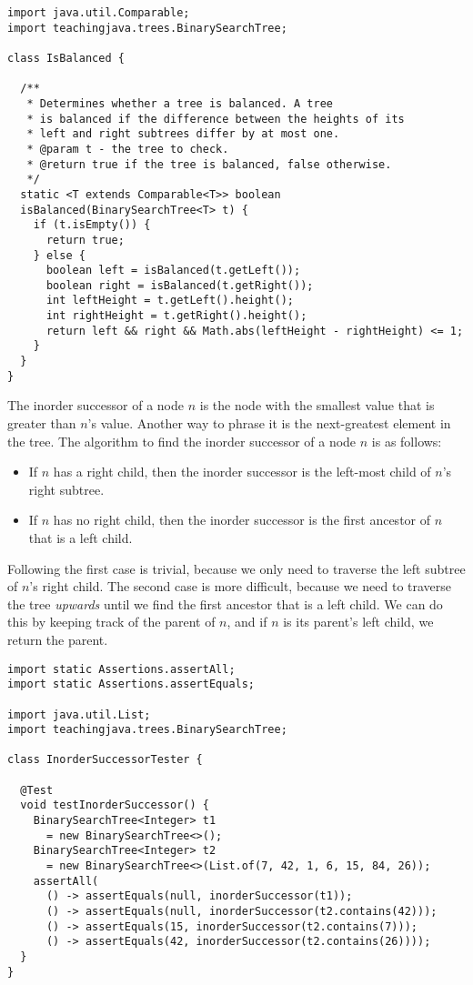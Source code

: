 \begin{lstlisting}[language=MyJava]
import java.util.Comparable;
import teachingjava.trees.BinarySearchTree;

class IsBalanced {

  /**
   * Determines whether a tree is balanced. A tree 
   * is balanced if the difference between the heights of its 
   * left and right subtrees differ by at most one.
   * @param t - the tree to check.
   * @return true if the tree is balanced, false otherwise.
   */
  static <T extends Comparable<T>> boolean 
  isBalanced(BinarySearchTree<T> t) {
    if (t.isEmpty()) {
      return true;
    } else {
      boolean left = isBalanced(t.getLeft());
      boolean right = isBalanced(t.getRight());
      int leftHeight = t.getLeft().height();
      int rightHeight = t.getRight().height();
      return left && right && Math.abs(leftHeight - rightHeight) <= 1;
    }
  }
}
\end{lstlisting}

The inorder successor of a node $n$ is the node with the smallest value that is greater than $n$'s value. 
Another way to phrase it is the next-greatest element in the tree.
The algorithm to find the inorder successor of a node $n$ is as follows:
\begin{itemize}
  \item If $n$ has a right child, then the inorder successor is the left-most child of $n$'s right subtree.
  \item If $n$ has no right child, then the inorder successor is the first ancestor of $n$ that is a left child.
\end{itemize}
Following the first case is trivial, because we only need to traverse the left subtree of $n$'s right child. 
The second case is more difficult, because we need to traverse the tree \emph{upwards} until we find the first ancestor that is a left child. 
We can do this by keeping track of the parent of $n$, and if $n$ is its parent's left child, we return the parent.


\begin{lstlisting}[language=MyJava]
import static Assertions.assertAll;
import static Assertions.assertEquals;

import java.util.List;
import teachingjava.trees.BinarySearchTree;

class InorderSuccessorTester {

  @Test
  void testInorderSuccessor() {
    BinarySearchTree<Integer> t1 
      = new BinarySearchTree<>();
    BinarySearchTree<Integer> t2 
      = new BinarySearchTree<>(List.of(7, 42, 1, 6, 15, 84, 26));
    assertAll(
      () -> assertEquals(null, inorderSuccessor(t1));
      () -> assertEquals(null, inorderSuccessor(t2.contains(42)));
      () -> assertEquals(15, inorderSuccessor(t2.contains(7)));
      () -> assertEquals(42, inorderSuccessor(t2.contains(26))));
  }
}
\end{lstlisting}

